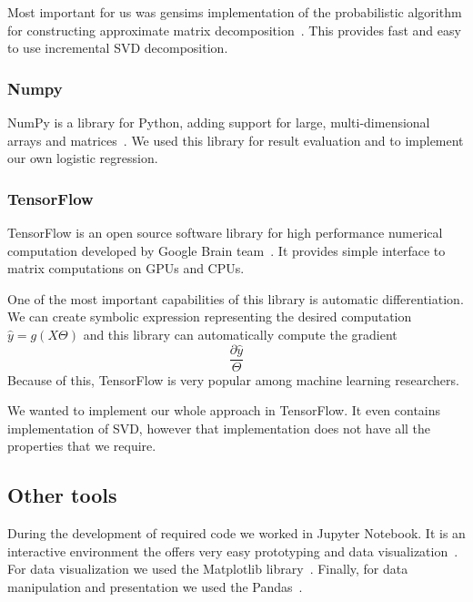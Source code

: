     Most important for us was gensims implementation of the probabilistic algorithm for constructing approximate matrix decomposition~\cite{halko2011finding}.
    This provides fast and easy to use incremental SVD decomposition.
    
    \subsubsection{Numpy}
    
    NumPy is a library for Python, adding support for large, multi-dimensional arrays and matrices~\cite{oliphant2006guide}. %
    We used this library for result evaluation and to implement our own logistic regression.
    
    \subsubsection{TensorFlow}
    
    TensorFlow is an open source software library for high performance numerical computation developed by Google Brain team~\cite{tensorflow2015-whitepaper}. 
    It provides simple interface to matrix computations on GPUs and CPUs.
    
    One of the most important capabilities of this library is automatic differentiation.
    We can create symbolic expression representing the desired computation $\hat{y}=g(X\Theta)$ and this library can automatically compute the gradient $$\frac{\partial \hat{y}}{\Theta}$$
    Because of this, TensorFlow is very popular among  machine learning researchers.
    
    We wanted to implement our whole approach in TensorFlow.
    It even contains implementation of SVD, however that implementation does not have all the properties that we require.
    
    \subsection{Other tools}
    
    During the development of required code we worked in Jupyter Notebook. 
    It is an interactive environment the offers very easy prototyping and
    data visualization~\cite{PER-GRA:2007}. %
    For data visualization we used the Matplotlib library~\cite{hunter2007matplotlib}. %
    Finally, for data manipulation and presentation we used the Pandas~\cite{mckinney2010data}. %
    
